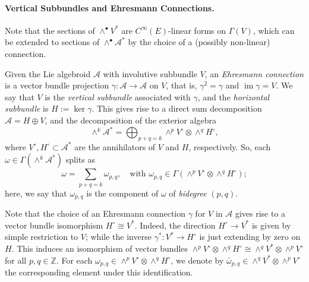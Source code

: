 \documentclass[12pt,letterpaper]{article}
\newcommand{\Z}{\mathbb{Z}}
\newcommand{\A}{\mathscr{A}}
\newcommand{\im}{\operatorname{im}}
\numberwithin{equation}{section}
\begin{document}
\paragraph{Vertical Subbundles and Ehresmann Connections.}

Note that the sections of $\wedge^\bullet V^*$ are $C^\infty(E)$-linear forms on $\Gamma(V)$,
which can be extended to sections of $\wedge^\bullet\A^*$ by the choice of a (possibly non-linear) connection.

Given the Lie algebroid $\A$ with involutive subbundle $V$, 
an \emph{Ehresmann connection} is a vector bundle projection $\gamma:\A\to\A$ on $V$, that is, $\gamma^2=\gamma$ and $\im\gamma = V$.
We say that $V$ is the \emph{vertical subbundle} associated with $\gamma$, 
and the \emph{horizontal subbundle} is $H:=\ker\gamma$.
This gives rise to a direct sum decomposition $\A=H\oplus V$,
and the decomposition of the exterior algebra
\[  \wedge^k\A^* = \bigoplus_{p+q=k} \wedge^p V^\circ \otimes \wedge^q H^\circ, \]
where $V^\circ,H^\circ\subset \A^*$ are the annihilators of $V$ and $H$, respectively.
So, each $\omega\in\Gamma(\wedge^k\A^*)$ splits as
\[  \omega = \sum_{p+q=k} \omega_{p,q}, \quad \text{with } \omega_{p,q}\in\Gamma(\wedge^p V^\circ \otimes \wedge^q H^\circ); \]
here, we say that $\omega_{p,q}$ is the component of $\omega$ of \emph{bidegree} $(p,q)$.

Note that the choice of an Ehresmann connection $\gamma$ for $V$ in $\A$
gives rise to a vector bundle isomorphism $H^\circ\cong V^*$.
Indeed, the direction $H^\circ\to V^*$ is given by simple restriction to $V$; 
while the inverse $\gamma^*:V^*\to H^\circ$ is just extending by zero on $H$.
This induces an isomorphism of vector bundles $\wedge^p V^\circ \otimes \wedge^q H^\circ\cong\wedge^q V^*\otimes\wedge^p V^\circ$ for all $p,q\in\Z$.
For each $\omega_{p,q}\in\wedge^p V^\circ \otimes \wedge^q H^\circ$, we denote by
$\bar{\omega}_{p,q}\in\wedge^q V^*\otimes\wedge^p V^\circ$ the corresponding element under this identification.
\end{document}
